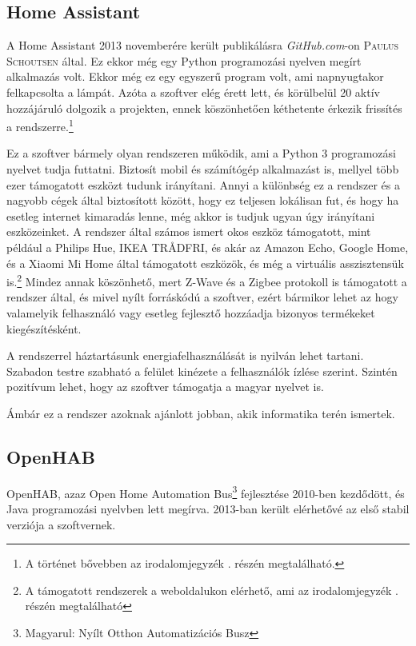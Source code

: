 \documentclass[
]{thesis-ekf}
\theoremstyle{definition}
\theoremstyle{remark}
\begin{document}
	\subsection{Home Assistant}
	A Home Assistant 2013 novemberére került publikálásra \emph{GitHub.com}-on \textsc{Paulus Schoutsen} által. Ez ekkor még egy Python programozási nyelven megírt alkalmazás volt.
	Ekkor még ez egy egyszerű program volt, ami napnyugtakor felkapcsolta a lámpát. Azóta a szoftver elég érett lett, és körülbelül 20 aktív hozzájáruló dolgozik a projekten, ennek köszönhetően kéthetente érkezik frissítés a rendszerre.\footnote{\label{history-of-home-assistant}A történet bővebben az irodalomjegyzék  \cite{creation-of-home-assistant}. részén megtalálható.}
	
	Ez a szoftver bármely olyan rendszeren működik, ami a Python 3 programozási nyelvet tudja futtatni. Biztosít mobil és számítógép alkalmazást is, mellyel több ezer támogatott eszközt tudunk irányítani. Annyi a különbség ez a rendszer és a nagyobb cégek által biztosított között, hogy ez teljesen lokálisan fut, és hogy ha esetleg internet kimaradás lenne, még akkor is tudjuk ugyan úgy irányítani eszközeinket. A rendszer által számos ismert okos eszköz támogatott, mint például a Philips Hue, IKEA TRÅDFRI, és akár az Amazon Echo, Google Home, és a Xiaomi Mi Home által támogatott eszközök, és még a virtuális asszisztensük is.\footnote{A támogatott rendszerek a weboldalukon elérhető, ami az irodalomjegyzék \cite{home-assistance-itegrations}. részén megtalálható} Mindez annak köszönhető, mert Z-Wave és a Zigbee protokoll is támogatott a rendszer által, és mivel nyílt forráskódú a szoftver, ezért bármikor lehet az hogy valamelyik felhasználó vagy esetleg fejlesztő hozzáadja bizonyos termékeket kiegészítésként. 

	A rendszerrel háztartásunk energiafelhasználását is nyilván lehet tartani. Szabadon testre szabható a felület kinézete a felhasználók ízlése szerint. Szintén pozitívum lehet, hogy az szoftver támogatja a magyar nyelvet is.
	
	Ámbár ez a rendszer azoknak ajánlott jobban, akik informatika terén ismertek.
	
	\subsection{OpenHAB}
	
	OpenHAB, azaz Open Home Automation Bus\footnote{Magyarul: Nyílt Otthon Automatizációs Busz} fejlesztése 2010-ben kezdődött, és Java programozási nyelvben lett megírva. 2013-ban került elérhetővé az első stabil verziója a szoftvernek. 
	
\end{document}
